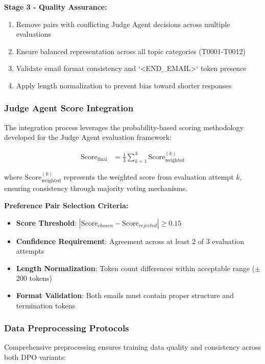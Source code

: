 \textbf{Stage 3 - Quality Assurance:}
\begin{enumerate}
    \item Remove pairs with conflicting Judge Agent decisions across multiple evaluations
    \item Ensure balanced representation across all topic categories (T0001-T0012)
    \item Validate email format consistency and `<END\_EMAIL>` token presence
    \item Apply length normalization to prevent bias toward shorter responses
\end{enumerate}

\subsubsection{Judge Agent Score Integration}

The integration process leverages the probability-based scoring methodology developed for the Judge Agent evaluation framework:

\begin{align}
\text{Score}_{\text{final}} &= \frac{1}{3} \sum_{k=1}^{3} \text{Score}_{\text{weighted}}^{(k)} \label{eq:consensus-score}
\end{align}

where $\text{Score}_{\text{weighted}}^{(k)}$ represents the weighted score from evaluation attempt $k$, ensuring consistency through majority voting mechanisms.

\textbf{Preference Pair Selection Criteria:}
\begin{itemize}
    \item \textbf{Score Threshold}: $|\text{Score}_{chosen} - \text{Score}_{rejected}| \geq 0.15$
    \item \textbf{Confidence Requirement}: Agreement across at least 2 of 3 evaluation attempts
    \item \textbf{Length Normalization}: Token count differences within acceptable range ($\pm$ 200 tokens)
    \item \textbf{Format Validation}: Both emails must contain proper structure and termination tokens
\end{itemize}

\subsubsection{Data Preprocessing Protocols}

Comprehensive preprocessing ensures training data quality and consistency across both DPO variants:

